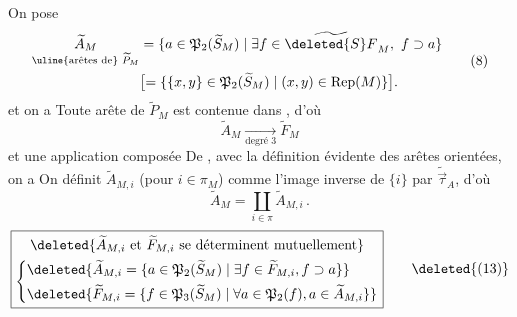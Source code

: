  On pose
\[
 \begin{aligned}
 \underset{\text{\uline{arêtes de} }\widetilde P_M}{\widetilde A_M}
 &=\{a\in\mathfrak P_2(\widetilde S_M)\mid\exists f\in\widetilde{\deleted{S} F}_M,\ f\supset a\}\\
 &\bigl[=\{\{x,y\}\in\mathfrak P_2(\widetilde S_M)\mid(x,y)\in\operatorname{Rep}(M)\}\bigr].
 \end{aligned}\tag*{(8)}
\]
et on a
 Toute arête de $\widetilde P_M$ est contenue dans  , d'où
\[
 \widetilde A_M\xrightarrow[\text{degré }3]{}\widetilde F_M
\]
et une application composée
De , avec la définition évidente des arêtes orientées, on a
On définit $\widetilde A_{M,i}$  (pour $i\in\pi_M$) comme l'image inverse de $\{i\}$ par $\widetilde{\overrightarrow\tau}_A$, d'où
\[
 \widetilde A_M=\coprod_{i\in\pi}\widetilde A_{M,i}\,.\tag*{(12)}
\]
\[
\boxed{\begin{gathered}
 \deleted{\widetilde A_{M,i}\text{ et }\widetilde F_{M,i}\text{ se déterminent mutuellement}}\\
 \left\{\begin{aligned}
 &\deleted{\widetilde A_{M,i}=\{a\in\mathfrak P_2(\widetilde S_M)\mid\exists f\in\widetilde F_{M,i},f\supset a\}}\\
 &\deleted{\widetilde F_{M,i}=\{f\in\mathfrak P_3(\widetilde S_M)\mid\forall a\in\mathfrak P_2(f),a\in\widetilde A_{M,i}\}}
 \end{aligned}\right.
\end{gathered}}\tag*{\deleted{(13)}}
\]
